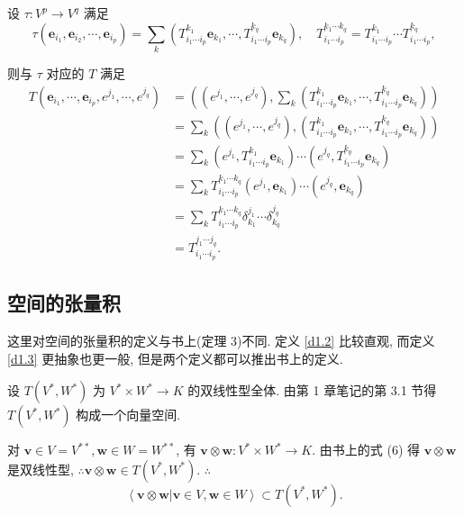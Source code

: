 \documentclass{ctexart}
\begin{document}
设 $\tau:V^p\to V^q$ 满足
\[\tau(\boldsymbol{e}_{i_1},\boldsymbol{e}_{i_2},\cdots,\boldsymbol{e}_{i_p})=\sum\limits_k(T_{i_1\cdots i_p}^{k_1}\boldsymbol{e}_{k_1},\cdots,T_{i_1\cdots i_p}^{k_q}\boldsymbol{e}_{k_q}),\quad T_{i_1\cdots i_p}^{k_1\cdots k_q}=T_{i_1\cdots i_p}^{k_1}\cdots T_{i_1\cdots i_p}^{k_q},\]

则与 $\tau$ 对应的 $T$ 满足
\begin{align*}
    T(\boldsymbol{e}_{i_1},\cdots,\boldsymbol{e}_{i_p},e^{j_1},\cdots,e^{j_q}) & =\left((e^{j_1},\cdots,e^{j_q}),\sum\limits_k(T_{i_1\cdots i_p}^{k_1}\boldsymbol{e}_{k_1},\cdots,T_{i_1\cdots i_p}^{k_q}\boldsymbol{e}_{k_q})\right) \\
    & =\sum\limits_k((e^{j_1},\cdots,e^{j_q}),(T_{i_1\cdots i_p}^{k_1}\boldsymbol{e}_{k_1},\cdots,T_{i_1\cdots i_p}^{k_q}\boldsymbol{e}_{k_q})) \\
    & =\sum\limits_k(e^{j_1},T_{i_1\cdots i_p}^{k_1}\boldsymbol{e}_{k_1})\cdots(e^{j_q},T_{i_1\cdots i_p}^{k_q}\boldsymbol{e}_{k_q}) \\
    & =\sum\limits_kT_{i_1\cdots i_p}^{k_1\cdots k_q}(e^{j_1},\boldsymbol{e}_{k_1})\cdots(e^{j_q},\boldsymbol{e}_{k_q}) \\
    & =\sum\limits_kT_{i_1\cdots i_p}^{k_1\cdots k_q}\delta_{k_1}^{j_1}\cdots\delta_{k_q}^{j_q} \\
    & =T_{i_1\cdots i_p}^{j_1\cdots j_q}.
\end{align*}
\subsection{空间的张量积}
这里对空间的张量积的定义与书上(定理 3)不同. 定义 \ref{d1.2} 比较直观, 而定义 \ref{d1.3} 更抽象也更一般, 但是两个定义都可以推出书上的定义.

设 $T(V^*,W^*)$ 为 $V^*\times W^*\to K$ 的双线性型全体. 由第 1 章笔记的第 3.1 节得 $T(V^*,W^*)$ 构成一个向量空间.

对 $\boldsymbol{v}\in V=V^{**},\boldsymbol{w}\in W=W^{**}$, 有 $\boldsymbol{v}\otimes\boldsymbol{w}:V^*\times W^*\to K$. 由书上的式 (6) 得 $\boldsymbol{v}\otimes\boldsymbol{w}$ 是双线性型, $\therefore\boldsymbol{v}\otimes\boldsymbol{w}\in T(V^*,W^*)$. $\therefore$
\[\left<\boldsymbol{v}\otimes\boldsymbol{w}|\boldsymbol{v}\in V,\boldsymbol{w}\in W\right>\subset T(V^*,W^*).\]
\end{document}
